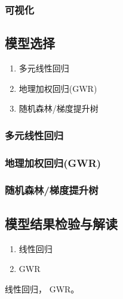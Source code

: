 \subsubsection*{可视化}

\subsection*{模型选择}
\begin{enumerate}
  \renewcommand{\labelenumi}{(\arabic*)}
  \item 多元线性回归
  \item 地理加权回归(GWR)
  \item 随机森林/梯度提升树
\end{enumerate}
\subsubsection*{多元线性回归}
\subsubsection*{地理加权回归(GWR)}
\subsubsection*{随机森林/梯度提升树}

\subsection*{模型结果检验与解读}
\begin{enumerate}
  \renewcommand{\labelenumi}{(\arabic*)}
  \item 线性回归
  \item GWR
\end{enumerate}

线性回归， GWR。

